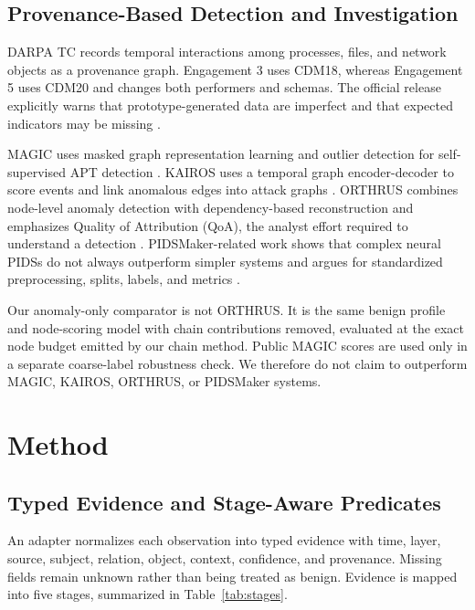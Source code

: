 \documentclass[runningheads]{llncs}
\begin{document}
\subsection{Provenance-Based Detection and Investigation}

DARPA TC records temporal interactions among processes, files, and network objects as a provenance graph. Engagement 3 uses CDM18, whereas Engagement 5 uses CDM20 and changes both performers and schemas. The official release explicitly warns that prototype-generated data are imperfect and that expected indicators may be missing \cite{darpa2020tc}.

MAGIC uses masked graph representation learning and outlier detection for self-supervised APT detection \cite{jia2024magic}. KAIROS uses a temporal graph encoder-decoder to score events and link anomalous edges into attack graphs \cite{cheng2024kairos}. ORTHRUS combines node-level anomaly detection with dependency-based reconstruction and emphasizes Quality of Attribution (QoA), the analyst effort required to understand a detection \cite{jiang2025orthrus}. PIDSMaker-related work shows that complex neural PIDSs do not always outperform simpler systems and argues for standardized preprocessing, splits, labels, and metrics \cite{bilot2025simpler,bilot2026pidsmaker}.

Our anomaly-only comparator is not ORTHRUS. It is the same benign profile and node-scoring model with chain contributions removed, evaluated at the exact node budget emitted by our chain method. Public MAGIC scores are used only in a separate coarse-label robustness check. We therefore do not claim to outperform MAGIC, KAIROS, ORTHRUS, or PIDSMaker systems.

\section{Method}

\subsection{Typed Evidence and Stage-Aware Predicates}

An adapter normalizes each observation into typed evidence with time, layer, source, subject, relation, object, context, confidence, and provenance. Missing fields remain unknown rather than being treated as benign. Evidence is mapped into five stages, summarized in Table~\ref{tab:stages}.
\end{document}
